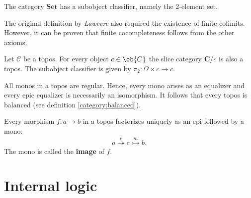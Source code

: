     \begin{example}
        The category $\mathbf{Set}$ has a subobject classifier, namely the 2-element set.
    \end{example}

    \begin{remark}
        The original definition by \textit{Lawvere} also required the existence of finite colimits. However, it can be proven that finite cocompleteness follows from the other axioms.
    \end{remark}

    \begin{theorem}
        Let $\mathcal{C}$ be a topos. For every object $c\in\ob{C}$ the slice category $\mathbf{C}/c$ is also a topos. The subobject classifier is given by $\pi_2:\Omega\times c\rightarrow c$.
    \end{theorem}

    \begin{property}[Balanced]
        All monos in a topos are regular. Hence, every mono arises as an equalizer and every epic equalizer is necessarily an isomorphism. It follows that every topos is balanced (see definition \ref{category:balanced}).
    \end{property}

    \begin{property}
        Every morphism $f:a\rightarrow b$ in a topos factorizes uniquely as an epi followed by a mono:
        \begin{gather}
            a\overset{e}{\twoheadrightarrow} c\overset{m}{\rightarrowtail} b.
        \end{gather}
        The mono is called the \textbf{image} of $f$.
    \end{property}

\section{Internal logic}\label{cat:internal_logic}

